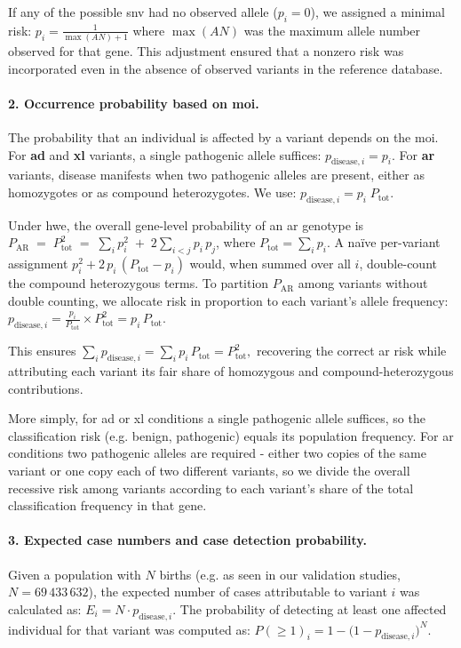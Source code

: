 If any of the possible \ac{snv}  had no observed allele (\(p_i = 0\)), we assigned a minimal risk:
$p_i = \frac{1}{\max(AN) + 1}$
where \(\max(AN)\) was the maximum allele number observed for that gene. This adjustment ensured that a nonzero risk was incorporated even in the absence of observed variants in the reference database.

\paragraph{2. Occurrence probability based on \ac{moi}.}
The probability that an individual is affected by a variant depends on the \ac{moi}. For \textbf{\ac{ad}} and \textbf{\ac{xl}} variants, a single pathogenic allele suffices:
$p_{\text{disease},i} = p_i$.
For\textbf{ \ac{ar}} variants, disease manifests when two pathogenic alleles are present, either as homozygotes or as compound heterozygotes. We use:
$p_{\text{disease},i} = p_i \; P_{\text{tot}}$. %

Under \ac{hwe}, the overall gene-level probability of an \ac{ar} genotype is
$P_{\text{AR}} \;=\; P_{\text{tot}}^2
\;=\;\sum_i p_i^2 \;+\; 2\sum_{i<j} p_i\,p_j$,
where \(P_{\text{tot}}=\sum_i p_i\). A naïve per-variant assignment
$p_i^2 + 2\,p_i\,(P_{\text{tot}} - p_i)$
would, when summed over all \(i\), double-count the compound heterozygous terms. 
To partition \(P_{\text{AR}}\) among variants without double counting, we allocate risk in proportion to each variant’s allele frequency:
$
p_{\text{disease},i}
=\frac{p_i}{P_{\text{tot}}}\times P_{\text{tot}}^2
= p_i\,P_{\text{tot}}$.

This ensures
$
\sum_i p_{\text{disease},i}
= \sum_i p_i\,P_{\text{tot}}
= P_{\text{tot}}^2,
$
recovering the correct \ac{ar} risk while attributing each variant its fair share of homozygous and compound-heterozygous contributions.

More simply, for \ac{ad} or \ac{xl} conditions a single pathogenic allele suffices, so the classification risk (e.g. benign, pathogenic) equals its population frequency. For \ac{ar} conditions two pathogenic alleles are required - either two copies of the same variant or one copy each of two different variants, so we divide the overall recessive risk among variants according to each variant’s share of the total classification frequency in that gene.

\paragraph{3. Expected case numbers and case detection probability.}
Given a population with \(N\) births (e.g. as seen in our validation studies, \(N = 69\,433\,632\)), the expected number of cases attributable to variant \(i\) was calculated as:
$E_i = N \cdot p_{\text{disease},i}$.
The probability of detecting at least one affected individual for that variant was computed as:
$P(\geq 1)_i = 1 - \bigl(1 - p_{\text{disease},i}\bigr)^N$.

